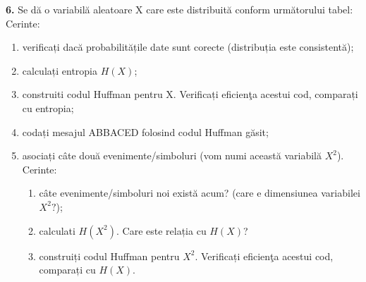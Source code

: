 \documentclass[a4paper]{article}
\begin{document}
\textbf{6.} Se dă o variabilă aleatoare X care este distribuită conform următorului tabel:
Cerinte:
\begin{enumerate}[label=(\alph*)]
    \item verificați dacă probabilitățile date sunt corecte (distribuția este consistentă);
    \item calculați entropia $H(X)$;
    \item construiti codul Huffman pentru X. Verificați eficienţa acestui cod, comparați cu entropia;
    \item codați mesajul ABBACED folosind codul Huffman găsit;
    \item asociați câte două evenimente/simboluri (vom numi această variabilă $X^{2}$). Cerinte:
    \begin{enumerate}[label=\roman*.]
        \item câte evenimente/simboluri noi există acum? (care e dimensiunea variabilei $X^{2}?$);
        \item calculati $H(X^{2})$. Care este relația cu $H(X)$?
        \item construiți codul Huffman pentru $X^{2}$. Verificați eficienţa acestui cod, comparați cu $H(X)$.
    \end{enumerate}
\end{enumerate}
\end{document}
